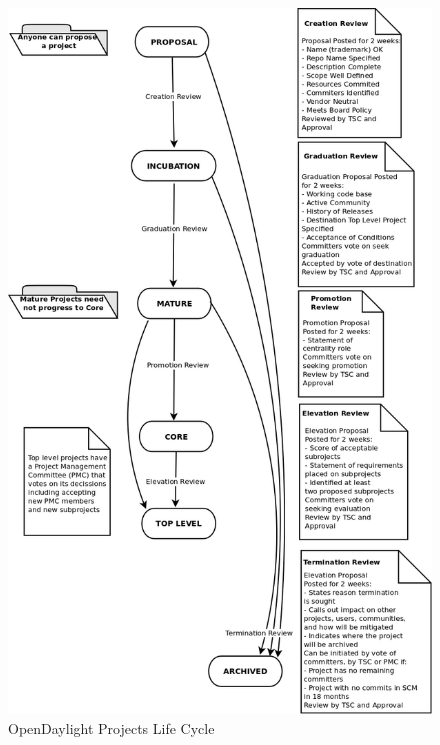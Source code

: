 \documentclass[a4paper, 12pt]{book}
\begin{document}
\begin{center}
 \begin{figure}
 \begin{center}
   \includegraphics[width=14cm]{img/odl-proj-lifecycle-00.png}
   \caption{OpenDaylight Projects Life Cycle}
   \label{fig:odl_tech_proj_life_diagram}
 \end{center}
 \end{figure}
\end{center}
\end{document}
